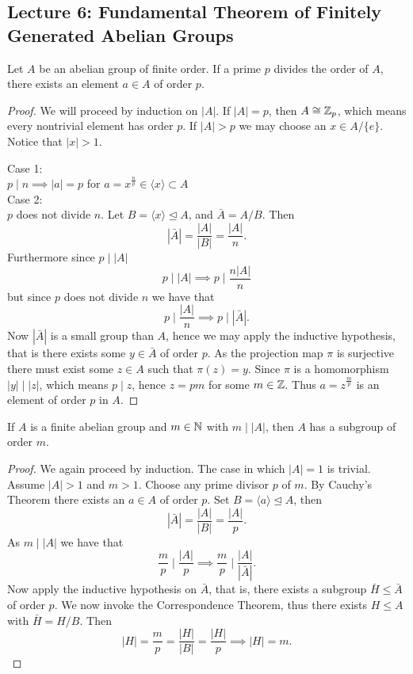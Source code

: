 \documentclass[11pt,leqno,oneside]{amsart}
\newcommand{\normsubgroup}{\mathrel{\unlhd}}
\begin{document}
\subsection*{Lecture 6: Fundamental
  Theorem of Finitely Generated Abelian
  Groups}

\begin{thm*}
  Let \(A\) be an abelian group of
  finite order. If a prime \(p\) divides
  the order of \(A\), there exists an
  element \(a \in A\) of order \(p\).
\end{thm*}

\begin{proof}
  We will proceed by induction on
  \(|A|\). If \(|A|=p\), then
  \(A \mathrel{\cong} {\mathbb Z}_p\), which means every
  nontrivial element has order
  \(p\). If \(|A| > p\) we may choose an
  \(x \in A/\{e\}\). Notice that
  \(|x| > 1\).

  \noindent Case 1:\\
  \(p \mid n \implies |a|=p\) for
  \(a=x^{\frac{n}{p}} \in \langle x
  \rangle \subset A\)\\

  \noindent Case 2:\\ \(p\) does not
  divide \(n\). Let
  \(B=\langle x \rangle \normsubgroup
  A\), and \(\bar{A}=A /B\). Then
  \[|\bar{A}|=\frac{|A|}{|B|}=\frac{|A|}{n}.\]
  Furthermore since \(p \mid |A|\)
  \[p \mid |A| \implies p \mid
    \frac{n|A|}{n}\] but since \(p\)
  does not divide \(n\) we have that
  \[p \mid \frac{|A|}{n}\implies p \mid
    |\bar{A}|.\] Now \(|\bar{A}|\) is a
  small group than \(A\), hence we may
  apply the inductive hypothesis, that
  is there exists some \(y \in \bar{A}\)
  of order \(p\). As the projection map
  \(\pi\) is surjective there must exist
  some \(z \in A\) such that
  \(\pi(z)=y\). Since \(\pi\) is a
  homomorphism \(|y| \mid |z|\), which
  means \(p \mid z\), hence \(z=pm\) for
  some \(m \in {\mathbb Z}\). Thus
  \(a=z^{\frac{m}{p}}\) is an element of
  order \(p\) in \(A\).
\end{proof}

\begin{prop*}[1.2.7]
  If \(A\) is a finite abelian group and
  \(m \in {\mathbb N}\) with \(m \mid |A|\), then
  \(A\) has a subgroup of order \(m\).
\end{prop*}
\begin{proof}
  We again proceed by induction. The
  case in which \(|A|=1\) is
  trivial. Assume \(|A|>1\) and
  \(m>1\). Choose any prime divisor
  \(p\) of \(m\). By Cauchy's Theorem
  there exists an \(a \in A\) of order
  \(p\). Set
  \(B=\langle a\rangle \unlhd A\), then
  \[|\bar{A}|=\frac{|A|}{|B|}=\frac{|A|}{p}.\]
  As \(m \mid |A|\) we have that
  \[\frac{m}{p} \mid \frac{|A|}{p}
    \implies \frac{m}{p} \mid
    \frac{|A|}{|\bar{A}|}.\] Now apply
  the inductive hypothesis on
  \(\bar{A}\), that is, there exists a
  subgroup \(\bar{H} \le \bar{A}\) of
  order \(p\). We now invoke the
  Correspondence Theorem, thus there
  exists \(H \le A\) with
  \(\bar{H}=H/B\). Then
  \[|H|=\frac{m}{p}=\frac{|H|}{|B|}=\frac{|H|}{p}
    \implies |H|=m.\]
\end{proof}
\end{document}
